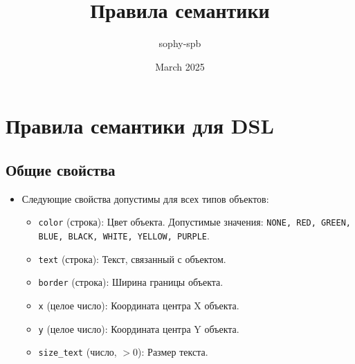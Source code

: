 \documentclass{article}
\title{Правила семантики}
\author{sophy-spb }
\date{March 2025}
\begin{document}
\section{Правила семантики для DSL}

\subsection{Общие свойства}
\begin{itemize}
    \item Следующие свойства допустимы для всех типов объектов:
    \begin{itemize}
        \item \texttt{color} (строка): Цвет объекта. Допустимые значения: \texttt{NONE, RED, GREEN, BLUE, BLACK, WHITE, YELLOW, PURPLE}.
        \item \texttt{text} (строка): Текст, связанный с объектом.
        \item \texttt{border} (строка): Ширина границы объекта.
        \item \texttt{x} (целое число): Координата центра X объекта.
        \item \texttt{y} (целое число): Координата центра Y объекта.
        \item \texttt{size\_text} (число, $> 0$): Размер текста.
    \end{itemize}
\end{itemize}
\end{document}
